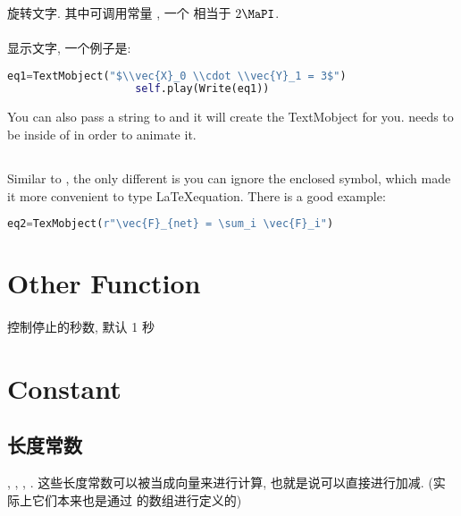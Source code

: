         \paragraph{ \\}
            旋转文字. 其中可调用常量 , 一个  相当于 $2\MaPI$.

        \paragraph{}
            显示文字, 一个例子是:
                \begin{lstlisting}[language = {Python}, gobble = 20]
                    eq1=TextMobject("$\\vec{X}_0 \\cdot \\vec{Y}_1 = 3$")
                    self.play(Write(eq1))
                \end{lstlisting}
            You can also pass a string to  and it will create the TextMobject for you.  needs to be inside of  in order to animate it.

    \subsection{}
        \hspace*{2em}Similar to , the only different is you can ignore the enclosed \Code{\$} symbol, which made it more convenient to type \LaTeX equation. There is a good example:
            \begin{lstlisting}[language = {Python}, gobble = 16]
                eq2=TexMobject(r"\vec{F}_{net} = \sum_i \vec{F}_i")
            \end{lstlisting}

\section{Other Function}
    \paragraph{}
        控制停止的秒数, 默认 1 秒

\section{Constant}
    \subsection{长度常数}
        , , , . 这些长度常数可以被当成向量来进行计算, 也就是说可以直接进行加减. (实际上它们本来也是通过  的数组进行定义的)

